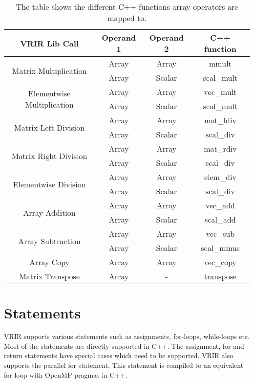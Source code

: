 					\begin{table}[h]
					\centering
					\begin{tabular}{|c|c|c|c|}
					\hline
					VRIR Lib Call                               & Operand 1 & Operand 2 & C++ function \\ \hline
					\multirow{2}{*}{Matrix Multiplication}      & Array     & Array     & mmult        \\ \cline{2-4} 
					& Array     & Scalar    & scal\_mult   \\ \hline
					\multirow{2}{*}{Elementwise Multiplication} & Array     & Array     & vec\_mult    \\ \cline{2-4} 
					& Array     & Scalar    & scal\_mult   \\ \hline
					\multirow{2}{*}{Matrix Left Division}       & Array     & Array     & mat\_ldiv    \\ \cline{2-4} 
					& Array     & Scalar    & scal\_div    \\ \hline
					\multirow{2}{*}{Matrix Right Division}      & Array     & Array     & mat\_rdiv    \\ \cline{2-4} 
					& Array     & Scalar    & scal\_div    \\ \hline
					\multirow{2}{*}{Elementwise Division}       & Array     & Array     & elem\_div    \\ \cline{2-4} 
					& Array     & Scalar    & scal\_div    \\ \hline
					\multirow{2}{*}{Array Addition}             & Array     & Array     & vec\_add     \\ \cline{2-4} 
					& Array     & Scalar    & scal\_add    \\ \hline
					\multirow{2}{*}{Array Subtraction}          & Array     & Array     & vec\_sub     \\ \cline{2-4} 
					& Array     & Scalar    & scal\_minus  \\ \hline
					Array Copy                                  & Array     & Array     & vec\_copy    \\ \hline
					Matrix Transpose                            & Array     & -         & transpose    \\ \hline
					\end{tabular}
					\caption[List of operations on Arrays]{The table shows the different C++ functions array operators are mapped to. }
					\label{tab:arrayOpMap}
					\end{table}
					\section{Statements}
					VRIR supports various statements such as assignments, for-loops, while-loops etc. Most of the statements are directly supported in C++. The assignment, for and return statements have special cases which need to be supported. VRIR also supports the parallel for statement. This statement is compiled to an equivalent for loop with OpenMP pragmas in C++.
